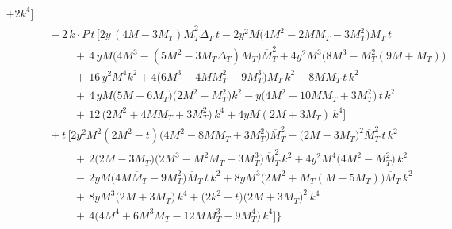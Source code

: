 \documentclass[preprintnumbers,prd,superscriptaddress,preprint]{revtex4-1}
\newcommand{\MTbar}{\overline{M}_T}
\begin{document}
\begin{subequations}
\begin{eqnarray}
    + 2 k^4 
\Big]
\nonumber \\
&&
-\, 2\, k\cdot P \, t\,
\Big[ 2 y\, (4M-3M_T) \MTbar^2 \Delta _T\, t
	- 2 y^2 M \big( 4 M^2 - 2 M M_T - 3 M_T^2 \big) \MTbar\, t
\nonumber \\
&& \qquad
    +\, 4\, y M \big( 4 M^3 - (5 M^2-3 M_T \Delta_T) M_T \big) \MTbar^2
    + 4 y^2 M^3 \big( 8 M^3 - M_T^2 (9M+M_T) \big)
\nonumber \\
&& \qquad
	+\, 16\, y^2 M^4 k^2
	+ 4 \big( 6 M^3 - 4 M M_T^2 - 9 M_T^3 \big) \MTbar\, k^2
    - 8 M \MTbar\, t\, k^2
\nonumber \\
&& \qquad
    +\, 4\, y M \big(5M+6M_T\big) \big(2M^2-M_T^2\big) k^2
    - y \big( 4 M^2 + 10 M M_T + 3 M_T^2 \big)\, t\, k^2
\nonumber \\
&& \qquad
    +\, 12\, \big( 2 M^2 + 4 M M_T + 3 M_T^2 \big)\, k^4 
	+ 4 y M (2M+3M_T)\, k^4
\Big]
\nonumber \\
&&
+\, t\,
\Big[ 2y^2 M^2 (2 M^2-t) \big( 4 M^2 - 8 M M_T + 3 M_T^2 \big) \MTbar^2
	- \big( 2M-3M_T \big)^2 \MTbar^2\, t\, k^2
\nonumber \\
&& \qquad
    +\, 2 \big(2M-3M_T\big) \big(2 M^3 - M^2 M_T - 3 M_T^3 \big) \MTbar^2\, k^2
	+ 4 y^2 M^4 \big(4M^2-M_T^2\big)\, k^2
\nonumber \\
&& \qquad
    -\, 2 y M \big(4 M \MTbar-9 M_T^2\big) \MTbar\, t\, k^2
	+ 8 y M^3 \big(2 M^2+M_T (M-5M_T)\big) \MTbar\, k^2
\nonumber \\
&& \qquad
    +\, 8 y M^3 \big(2M+3M_T\big)\, k^4
    + \big(2 k^2-t) \big(2M+3M_T\big)^2\, k^4
\nonumber \\
&& \qquad
    +\, 4 \big(4 M^4 + 6 M^3 M_T - 12 M M_T^3 - 9 M_T^4\big)\, k^4
\Big]
\bigg\}\, .
\end{eqnarray}
\end{subequations}
\end{document}
